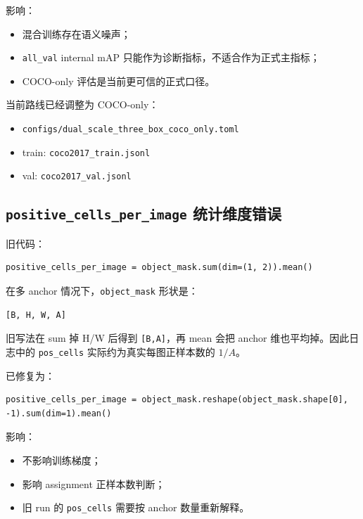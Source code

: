 \documentclass[UTF8]{ctexart}
\begin{document}
影响：

\begin{itemize}[leftmargin=2em]
  \item 混合训练存在语义噪声；
  \item \texttt{all\_val} internal mAP 只能作为诊断指标，不适合作为正式主指标；
  \item COCO-only 评估是当前更可信的正式口径。
\end{itemize}

当前路线已经调整为 COCO-only：

\begin{itemize}[leftmargin=2em]
  \item \texttt{configs/dual\_scale\_three\_box\_coco\_only.toml}
  \item train: \texttt{coco2017\_train.jsonl}
  \item val: \texttt{coco2017\_val.jsonl}
\end{itemize}

\subsection{\texttt{positive\_cells\_per\_image} 统计维度错误}

旧代码：

\begin{verbatim}
positive_cells_per_image = object_mask.sum(dim=(1, 2)).mean()
\end{verbatim}

在多 anchor 情况下，\texttt{object\_mask} 形状是：

\begin{verbatim}
[B, H, W, A]
\end{verbatim}

旧写法在 sum 掉 H/W 后得到 \texttt{[B,A]}，再 mean 会把 anchor 维也平均掉。因此日志中的 \texttt{pos\_cells} 实际约为真实每图正样本数的 $1/A$。

已修复为：

\begin{verbatim}
positive_cells_per_image = object_mask.reshape(object_mask.shape[0], -1).sum(dim=1).mean()
\end{verbatim}

影响：

\begin{itemize}[leftmargin=2em]
  \item 不影响训练梯度；
  \item 影响 assignment 正样本数判断；
  \item 旧 run 的 \texttt{pos\_cells} 需要按 anchor 数量重新解释。
\end{itemize}
\end{document}
